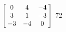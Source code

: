 {$\left[\hskip -3pt \begin{array}{ccc} 0&4&-4\\  3&1&-3
\\  -3&-4&0\end{array}\hskip -3pt \right]$} 
{$72$}



  

